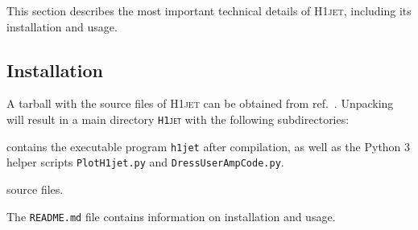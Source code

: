 \documentclass[12pt]{article}
\begin{document}
This section describes the most important technical details of
\textsc{H1jet}, including its installation and usage.

\subsection{Installation} 
A tarball with the source files of \textsc{H1jet} can be obtained from
ref.~\cite{h1jet}. Unpacking will result in a main directory
\texttt{\textsc{H1jet}} with the following subdirectories:
\begin{description}[labelindent=1cm, labelwidth =\widthof{\bfseries9999}, leftmargin = !]
	\item[\texttt{bin} :] contains the executable program \texttt{h1jet} after compilation, as well as the Python 3 helper scripts \texttt{PlotH1jet.py} and \texttt{DressUserAmpCode.py}. 
	\item[\texttt{src} :] source files. 
\end{description}
The \texttt{README.md} file contains information on installation and usage. \\
\end{document}
